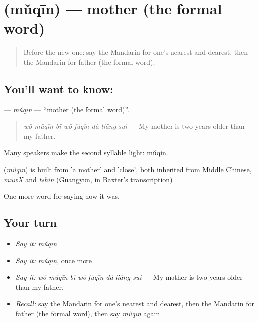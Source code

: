 \section[\texorpdfstring{\zh{母亲} (mǔqīn)}{母亲 (mǔqīn)}]{ (mǔqīn) — mother (the formal word)}

\label{lesson:ZH-C511-muqin}



\begin{quote}
Before the new one: say the Mandarin for one's nearest and dearest, then the Mandarin for father (the formal word).
\end{quote}

\subsection*{You'll want to know: }
\textbf{} — \emph{mǔqīn} — \textquotedblleft{}mother (the formal word)\textquotedblright{}.

\begin{quote}
\textbf{} \emph{wǒ mǔqīn bǐ wǒ fùqīn dà liǎng suì} — My mother is two years older than my father.
\end{quote}

Many speakers make the second syllable light: mǔqin.

\begin{cousinweb}
\textbf{} (\emph{mǔqīn}) is built from  'a mother' and  'close', both inherited from Middle Chinese, \emph{muwX} and \emph{tshin} (Guangyun, in Baxter's transcription).
\end{cousinweb}

\begin{grammarlens}[title={What you've built}]
One more word for saying how it was.
\end{grammarlens}

\subsection*{Your turn}
\begin{itemize}
\raggedright
  \item \emph{Say it:} \emph{mǔqīn}
  \item \emph{Say it:} \emph{mǔqīn}, once more
  \item \emph{Say it:} \emph{wǒ mǔqīn bǐ wǒ fùqīn dà liǎng suì} — My mother is two years older than my father.
  \item \emph{Recall:} say the Mandarin for one's nearest and dearest, then the Mandarin for father (the formal word), then say \emph{mǔqīn} again
\end{itemize}

